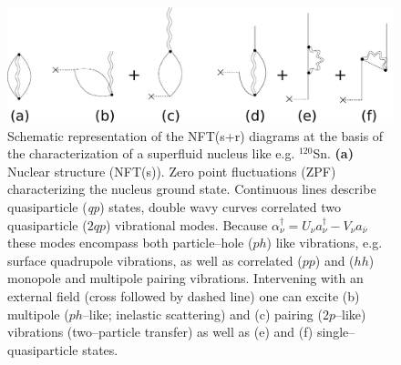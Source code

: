 \begin{figure}
\begin{center}
\includegraphics[width=\textwidth]{introduccion/figs/fig1_4_2.pdf}
\caption{Schematic representation of the NFT(s+r) diagrams at the basis of the characterization of a superfluid nucleus like e.g. $^{120}$Sn. \textbf{(a)} Nuclear structure (NFT(s)). Zero point fluctuations (ZPF) characterizing the nucleus ground state. Continuous lines describe quasiparticle (\textit{qp}) states, double wavy curves correlated two quasiparticle ($2qp$) vibrational modes. Because $\alpha^{\dagger}_{\nu}=U_\nu a^\dagger_\nu-V_\nu a_{\bar{\nu}}$ these modes encompass both particle--hole ($ph$) like vibrations, e.g. surface quadrupole vibrations, as well as correlated ($pp$) and ($hh$) monopole and multipole pairing vibrations. Intervening with an external field (cross followed by dashed line) one can excite (b) multipole ($ph$--like; inelastic scattering) and (c) pairing ($2p$--like) vibrations (two--particle transfer) as well as (e) and (f) single--quasiparticle states.}\label{fig1.4.2}
\end{center}
\end{figure}

